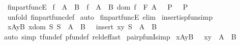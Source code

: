 \begin{isabellebody}
\isanewline
{}\isamarkupfalse%
\ fin{\isacharunderscore}part{\isacharunderscore}funcE{\isacharcolon}\ \isanewline
{\isachardoublequoteopen}{\isasymlbrakk}f\ {\isacharcolon}\ A\ {\isacharminus}{\isacharbar}{\isacharbar}{\isacharminus}{\isachargreater}\ B{\isacharsemicolon}\ {\isacharbrackleft}{\isacharbar}\ f\ {\isacharcolon}\ A\ {\isacharminus}{\isacharbar}{\isacharminus}{\isachargreater}\ B{\isacharsemicolon}\ dom\ f\ {\isacharcolon}\ {\isacharpercent}F\ A\ {\isacharbar}{\isacharbrackright}\ {\isacharequal}{\isacharequal}{\isachargreater}\ P\ {\isasymrbrakk}\ {\isasymLongrightarrow}\ P{\isachardoublequoteclose}\isanewline
%
\isadelimproof
%
\endisadelimproof
%
\isatagproof
{}\isamarkupfalse%
\ {\isacharparenleft}unfold\ fin{\isacharunderscore}part{\isacharunderscore}func{\isacharunderscore}def{\isacharparenright}\isanewline
{}\isamarkupfalse%
\ auto\isanewline
{}\isamarkupfalse%
%
\endisatagproof
{\isafoldproof}%
%
\isadelimproof
\isanewline
%
\endisadelimproof
{}\isamarkupfalse%
\ fin{\isacharunderscore}part{\isacharunderscore}funcE\ {\isacharbrackleft}elim{\isacharbang}{\isacharbrackright}\isanewline
\isanewline
\isanewline
\isanewline
{}\isamarkupfalse%
\ insert{\isacharunderscore}is{\isacharunderscore}pfun{\isacharbrackleft}simp{\isacharbrackright}{\isacharcolon}\isanewline
{\isachardoublequoteopen}{\isacharbrackleft}{\isacharbar}\ x{\isacharcolon}A{\isacharsemicolon}y{\isacharcolon}B{\isacharsemicolon}\ x{\isasymnotin}dom\ S{\isacharsemicolon}\ S\ {\isacharcolon}\ A\ {\isacharminus}{\isacharbar}{\isacharminus}{\isachargreater}\ B\ {\isacharbar}{\isacharbrackright}\ {\isacharequal}{\isacharequal}{\isachargreater}\ {\isacharparenleft}insert\ {\isacharparenleft}x{\isacharcomma}y{\isacharparenright}\ S{\isacharparenright}\ {\isacharcolon}\ A\ {\isacharminus}{\isacharbar}{\isacharminus}{\isachargreater}\ B{\isachardoublequoteclose}\isanewline
%
\isadelimproof
%
\endisadelimproof
%
\isatagproof
{}\isamarkupfalse%
{\isacharparenleft}auto\ simp{\isacharcolon}\ tfun{\isacharunderscore}def\ pfun{\isacharunderscore}def\ rel{\isacharunderscore}def{\isacharcomma}fast{\isacharparenright}%
\endisatagproof
{\isafoldproof}%
%
\isadelimproof
\isanewline
%
\endisadelimproof
\isanewline
{}\isamarkupfalse%
\ pair{\isacharunderscore}pfunI{\isacharbrackleft}simp{\isacharbrackright}{\isacharcolon}\isanewline
{\isachardoublequoteopen}{\isacharbrackleft}{\isacharbar}\ x{\isacharcolon}A{\isacharsemicolon}y{\isacharcolon}B\ {\isacharbar}{\isacharbrackright}\ {\isacharequal}{\isacharequal}{\isachargreater}\ {\isacharbraceleft}{\isacharparenleft}x{\isacharcomma}y{\isacharparenright}{\isacharbraceright}\ {\isacharcolon}\ A\ {\isacharminus}{\isacharbar}{\isacharminus}{\isachargreater}\ B{\isachardoublequoteclose}\isanewline

\end{isabellebody}

